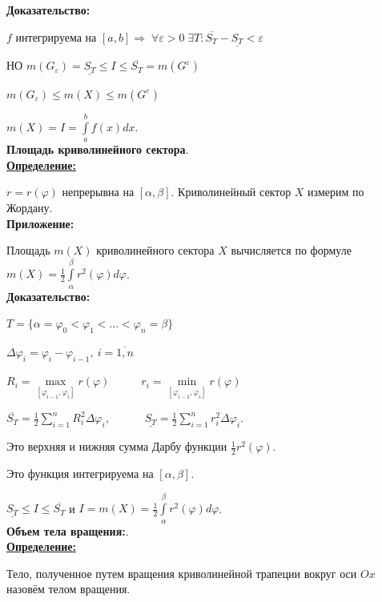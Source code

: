 \documentclass[a4paper,12pt]{article} %
\renewcommand {\leq}{\leqslant}
\begin{document}
\textbf{Доказательство:} 

$f$ интегрируема на $[a, b] \Rightarrow \; \forall \varepsilon > 0 \; \exists T: \overline{S_T} - \underline{S_T} < \varepsilon$

НО $m(G_{\varepsilon}) = \underline{S_T} \leq I \leq \overline{S_T} = m(G^{\varepsilon}) $

$m(G_{\varepsilon}) \leq m(X) \leq m(G^{\varepsilon})$

$m(X) = I = \int\limits_a^b f(x)dx$.\\

\noindent \textbf{Площадь криволинейного сектора}.\\

\underline{\textbf{Определение:}}

$r=r(\varphi)$ непрерывна на $[\alpha, \beta]$. Криволинейный сектор $X$ измерим по Жордану.\\

\textbf{Приложение:}

Площадь $m(X)$ криволинейного сектора $X$ вычисляется по формуле $m(X) =  \frac{1}{2} \int\limits_{\alpha}^{\beta} r^2(\varphi)d\varphi$.\\

\textbf{Доказательство:}

$T = \{\alpha = \varphi_0 < \varphi_1 <\dots < \varphi_n = \beta\}$

$\Delta \varphi_i = \varphi_i - \varphi_{i-1}, ~i = \overline{1, n}$

$R_i = \max \limits_{[\varphi_{i-1}, \varphi_{i}]} r(\varphi)\; \;\;\;\;\;\;\;\;\; r_i=\min \limits_{[\varphi_{i-1}, \varphi_{i}]} r(\varphi)\;$

$\overline{S_T} = \frac{1}{2}\sum\limits_{i=1}^n R_i^2 \Delta \varphi_i,\;\;\;\;\;\;\;\;\;\;\; \underline{S_T} =\frac{1}{2}\sum\limits_{i=1}^n r_i^2 \Delta \varphi_i$.

Это верхняя и нижняя сумма Дарбу функции $\frac{1}{2}r^2(\varphi)$.

Это функция интегрируема на $[\alpha, \beta]$.

$\underline{S_T} \leq I \leq \overline{S_T}$ и $I = m(X) = \frac{1}{2}\int\limits_{\alpha}^{\beta}r^2(\varphi)d\varphi$.\\

\noindent \textbf{Объем тела вращения:}.\\

\underline{\textbf{Определение:}}

Тело, полученное путем вращения криволинейной трапеции вокруг оси $Ox$ назовём телом вращения.\\
\end{document}
